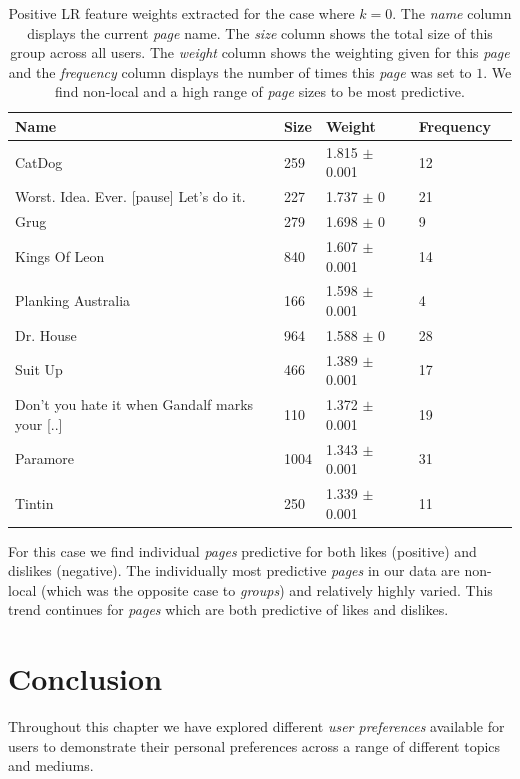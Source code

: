 \begin{table}[h]
\begin{minipage}[b]{1.0\textwidth}
\centering
  \begin{tabular}{|l|l|l|l|l|} %
  \hline
  \textbf{Name} & \textbf{Size} & \textbf{Weight} & \textbf{Frequency} \\ \hline
\small{CatDog}  & 259 & 1.815 $\pm$ 0.001 & 12 \\ \hline
\small{Worst. Idea. Ever. [pause] Let's do it.}  & 227 & 1.737 $\pm$ 0 & 21 \\ \hline
\small{Grug}  & 279 & 1.698 $\pm$ 0 & 9 \\ \hline
\small{Kings Of Leon}  & 840 & 1.607 $\pm$ 0.001 & 14 \\ \hline
\small{Planking Australia}  & 166 & 1.598 $\pm$ 0.001 & 4 \\ \hline
\small{Dr. House}  & 964 & 1.588 $\pm$ 0 & 28 \\ \hline
\small{Suit Up}  & 466 & 1.389 $\pm$ 0.001 & 17 \\ \hline
\small{Don't you hate it when Gandalf marks your [..]}  & 110 & 1.372 $\pm$ 0.001 & 19 \\ \hline
\small{Paramore}  & 1004 & 1.343 $\pm$ 0.001 & 31 \\ \hline
\small{Tintin}  & 250 & 1.339 $\pm$ 0.001 & 11 \\ \hline
  \end{tabular}
 \caption{Positive LR feature weights extracted for the case where $k=0$. The \emph{name} column displays the current \emph{page} name.
  The \emph{size} column shows the total size of this group across all users.
  The \emph{weight} column shows the weighting given for this \emph{page} and the \emph{frequency} column displays the number of times 
  this \emph{page} was set to $1$. We find non-local and a high range of \emph{page} sizes to be most predictive.}
\end{minipage}
\end{table}

For this case we find individual \emph{pages} predictive for both likes (positive) and dislikes (negative). 
The individually most predictive \emph{pages} in our data are non-local (which was the opposite case to \emph{groups}) and
relatively highly varied. This trend continues for \emph{pages} which are both predictive of likes and dislikes.

\section{Conclusion}
\label{sec:conc}
Throughout this chapter we have explored different \emph{user preferences} available for users to demonstrate their personal preferences across a range of 
different topics and mediums.

